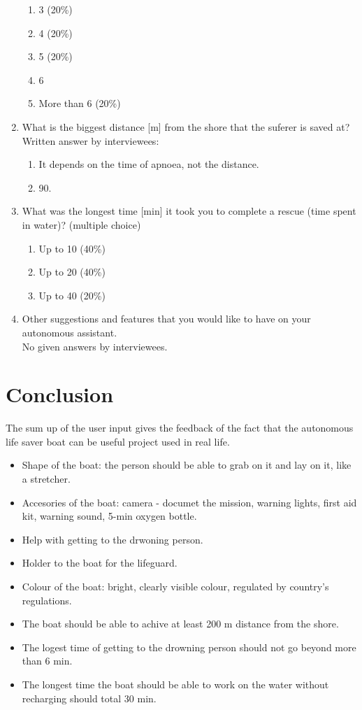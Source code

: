 \begin{enumerate}
\begin{enumerate}
        \item   3 (20\%)
        \item   4 (20\%)
        \item   5 (20\%)
        \item   6
        \item   More than 6 (20\%)
    \end{enumerate}
    \item What is the biggest distance [m] from the shore that the suferer is saved at?\\
            Written answer by interviewees:
            \begin{enumerate}
                \item It depends on the time of apnoea, not the distance.
                \item 90.
            \end{enumerate} 
    \item What was the longest time [min] it took you to complete a rescue (time spent in water)? (multiple choice)
    \begin{enumerate}
        \item  Up to 10 (40\%)
        \item  Up to 20 (40\%)
        \item  Up to 40 (20\%)
    \end{enumerate}
    \item Other suggestions and features that you would like to have on your autonomous assistant.\\
           No given answers by interviewees.     
\end{enumerate}

\section*{Conclusion}
The sum up of the user input gives the feedback of the fact that the autonomous life saver boat can be useful project used in real life. 
\begin{itemize}
     \item Shape of the boat: the person should be able to grab on it and lay on it, like a stretcher.
     \item Accesories of the boat: camera - documet the mission, warning lights, first aid kit, warning sound, 5-min oxygen bottle.
     \item Help with getting to the drwoning person.
     \item Holder to the boat for the lifeguard.
     \item Colour of the boat: bright, clearly visible colour, regulated by country's regulations.
     \item The boat should be able to achive at least 200 m distance from the shore.
     \item The logest time of getting to the drowning person should not go beyond more than 6 min.
     \item The longest time the boat should be able to work on the water without recharging should total 30 min.
\end{itemize}

